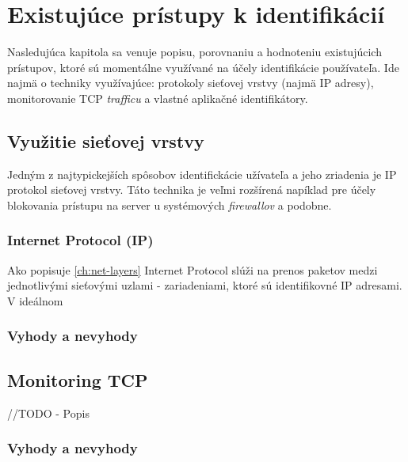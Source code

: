 \documentclass[
  printed, %
  table,   %
  lof,     %
  lot,     %
]{fithesis3}
\begin{document}



\chapter{Existujúce prístupy k identifikácií}
\label{ch:existing}
Nasledujúca kapitola sa venuje popisu, porovnaniu a hodnoteniu existujúcich
prístupov, ktoré sú momentálne využívané na účely identifikácie používateľa.
Ide najmä o techniky využívajúce: protokoly sieťovej vrstvy (najmä IP adresy),
monitorovanie TCP \textit{trafficu} a vlastné aplikačné identifikátory.

\section{Využitie sieťovej vrstvy}
Jedným z najtypickejších spôsobov identifickácie užívateľa a jeho zriadenia je
IP protokol sieťovej vrstvy. Táto technika je veľmi rozšírená napíklad pre
účely blokovania prístupu na server u systémových \textit{firewallov} a
podobne.

\subsection{Internet Protocol (IP)}
Ako popisuje \ref{ch:net-layers} Internet Protocol slúži na prenos paketov
medzi jednotlivými sieťovými uzlami - zariadeniami, ktoré sú identifikovné
IP adresami. V ideálnom 


\subsection{Vyhody a nevyhody}
\section{Monitoring TCP}
//TODO - Popis
\subsection{Vyhody a nevyhody}
\end{document}
